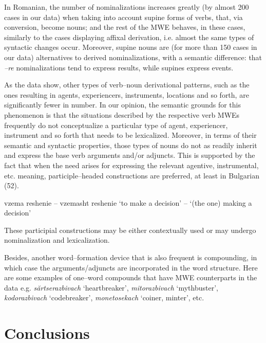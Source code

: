 \documentclass[output=paper]{langsci/langscibook}
\begin{document}
In Romanian, the
number of nominalizations increases greatly (by almost 200 cases in our
data) when taking into account supine forms of verbs, that, via
conversion, become nouns; and the rest of the MWE behaves, in these
cases, similarly to the cases displaying affixal derivation, i.e.
almost the same types of syntactic changes occur. Moreover, supine
nouns are (for more than 150 cases in our data) alternatives to derived
nominalizations, with a semantic difference: \cite{cornilescu2001}
that \textit{–re} nominalizations tend to express results, while supines
express events.



As the data show, other types of verb–noun derivational patterns, such
as the ones resulting in agents, experiencers, instruments, locations
and so forth, are significantly fewer in number. In our opinion, the
semantic grounds for this phenomenon is that the situations described
by the respective verb MWEs frequently do not conceptualize a
particular type of agent, experiencer, instrument and so forth that
needs to be lexicalized. Moreover, in terms of their semantic and
syntactic properties, those types of nouns do not as readily inherit
and express the base verb arguments and/or adjuncts. This is supported
by the fact that when the need arises for expressing the relevant
agentive, instrumental, etc. meaning, participle–headed constructions
are preferred, at least in Bulgarian (52).


\begin{exe}
\ex \label{ex:8:50}
\settowidth{}
vzema reshenie – vzemasht reshenie 
‘to make a decision’ – ‘(the one) making a decision’
\end{exe}




These participial constructions may be either contextually used or may
undergo nominalization and lexicalization.



Besides, another word–formation device that is also frequent is
compounding, in which case the arguments/adjuncts are incorporated in
the word structure. Here are some examples of one–word compounds that
have MWE counterparts in the data e.g. \textit{sărtserazbivach}
‘heartbreaker’, \textit{mitorazbivach} ‘mythbuster’, \textit{kodorazbivach}
‘codebreaker’, \textit{monetosekach} ‘coiner, minter', etc. 



\section{Conclusions}
\end{document}
